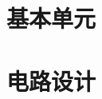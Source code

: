 \documentclass{xNoteBook}
\begin{document}
\tableofcontents
\listoffigures
\listoftables

\mainmatter

\nocite{*}

\part{基本单元}





\part{电路设计}




\appendix

\backmatter



\end{document}
